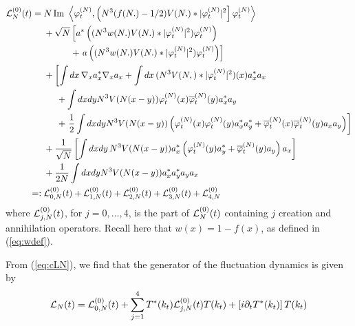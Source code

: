 \documentclass[11pt,a4paper]{article}
\newcommand{\cL}{{\cal L}}
\begin{document}
\[ \begin{split} \cL_N^{(0)} (t) = \; & N \, \text{Im } \left\langle
\varphi_t^{(N)} , \left(N^3 (f(N.) - 1/2) V(N.) * |\varphi_t^{(N)}|^2
\right] \varphi_t^{(N)} \right\rangle \\ &+ \sqrt{N}  \left[  a^*\left( (N^3
w(N.) V (N.) *| \varphi_t^{(N)}|^2) \varphi_t^{(N)} \right) \right. \\
& \quad \qquad + \left. a\left( (N^3 w (N.)V (N.) *| \varphi_t^{(N)}|^2) \varphi_t^{(N)} \right) \right] \\
&+ \left[ \int dx \, \nabla_x a_x^* \nabla_x a_x + \int dx \, (N^3 V (N,) * |\varphi_t^{(N)}|^2) (x) a_x^* a_x \right. \\ 
&\hspace{.5cm}+ \int dx dy N^3 V(N (x-y)) \varphi_t^{(N)} (x) \overline{\varphi}_t^{(N)} (y) a_x^* a_y \\
&\hspace{.5cm}+ \left.  \frac{1}{2} \int dx dy N^3 V(N (x-y)) \left( \varphi_t^{(N)} (x) \varphi_t^{(N)} (y) a_x^* a_y^* + 
\overline{\varphi}_t^{(N)} (x) \overline{\varphi}_t^{(N)} (y) a_x a_y \right) \right] \\
&+ \frac{1}{\sqrt{N}} \left[  \int dx dy \, N^3 V(N(x-y)) a_x^* \left( \varphi_t^{(N)} (y) a_y^* + \overline{\varphi}_t^{(N)} (y) a_y \right) a_x \right] \\
&+\frac{1}{2N} \int dx dy N^3 V(N (x-y)) a_x^* a_y^* a_y a_x \\
=: \; & \cL_{0,N}^{(0)} (t) + \cL_{1,N}^{(0)} (t) + \cL_{2,N}^{(0)} (t) +  
\cL_{3,N}^{(0)} (t) + \cL_{4,N}^{(0)} 
\end{split} \]
where $\cL^{(0)}_{j,N} (t)$, for $j=0, \dots , 4$, is the part of $\cL_N^{(0)} (t)$ containing $j$ creation and annihilation operators. Recall here that $w (x) = 1 - f (x)$, as defined in (\ref{eq:wdef}). 

{F}rom (\ref{eq:cLN}), we find that the generator of the fluctuation dynamics is given by
\begin{equation}\label{eq:dec-cLN} \cL_N (t) =  \cL_{0,N}^{(0)} (t) + \sum_{j=1}^4 T^* (k_t) \cL_{j,N}^{(0)} (t) T (k_t) +\left[ i \partial_t T^* (k_t) \right] T(k_t) \end{equation}
\end{document}
